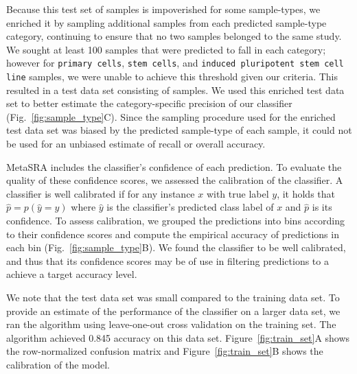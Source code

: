 Because this test set of \TestSetSize{} samples is impoverished for some sample-types, we enriched it by sampling additional samples from each predicted sample-type category, continuing to ensure that no two samples belonged to the same study.  We sought at least 100 samples that were predicted to fall in each category; however for \texttt{primary cells}, \texttt{stem cells}, and \texttt{induced pluripotent stem cell line} samples, we were unable to achieve this threshold given our criteria. This resulted in a test data set consisting of \EnrichedSampleTypeTestSetSize{} samples.  We used this enriched test data set to better estimate the category-specific precision of our classifier (Fig.~\ref{fig:sample_type}C).  Since the sampling procedure used for the enriched test data set was biased by the predicted sample-type of each sample, it could not be used for an unbiased estimate of recall or overall accuracy.

MetaSRA includes the classifier's confidence of each prediction. To evaluate the quality of these confidence scores, we assessed the calibration of the classifier.  A classifier is well calibrated if for any instance $x$ with true label $y$, it holds that $\hat{p} = p(\hat{y} = y)$ where $\hat{y}$ is the classifier's predicted class label of $x$ and $\hat{p}$ is its confidence. To assess calibration, we grouped the predictions  into bins according to their confidence scores and compute the empirical accuracy of predictions in each bin (Fig.~\ref{fig:sample_type}B).  We found the classifier to be well calibrated, and thus that its confidence scores may be of use in filtering predictions to a achieve a target accuracy level.

We note that the test data set was small compared to the training data set. To provide an estimate of the performance of the classifier on a larger data set, we ran the algorithm using leave-one-out cross validation on the training set. The algorithm achieved 0.845 accuracy on this data set.  Figure~\ref{fig:train_set}A shows the row-normalized confusion matrix and Figure~\ref{fig:train_set}B shows the calibration of the model.

